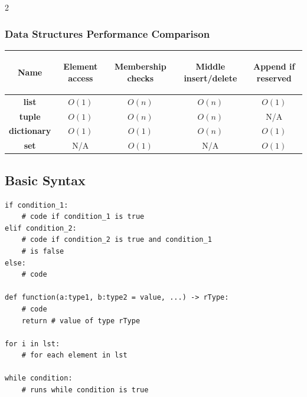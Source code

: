 \documentclass[5pt]{article}
\begin{document}
\begin{multicols}{2}
\subsubsection{Data Structures Performance Comparison}
\begin{tabular}{|>{\small\bfseries}c|>{\small}c|>{\small}c|>{\small}c|>{\small}c|}
    \hline
    Name   & \begin{sideways}Element access\end{sideways} & \begin{sideways}Membership checks\end{sideways} & \begin{sideways}Middle insert/delete\end{sideways} & \begin{sideways}Append if reserved\end{sideways} \\
    \hline
    list        & $O(1)$ & $O(n) $ & $O(n)$ & $O(1)$ \\
    tuple       & $O(1)$ & $O(n) $ & $O(n)$ & N/A    \\
    dictionary  & $O(1)$ & $O(1) $ & $O(n)$ & $O(1)$ \\
    set         & N/A    & $O(1) $ & N/A    & $O(1)$ \\
    \hline
\end{tabular}

\subsection{Basic Syntax}
\begin{verbatim}
if condition_1:
    # code if condition_1 is true
elif condition_2:
    # code if condition_2 is true and condition_1
    # is false
else:
    # code

def function(a:type1, b:type2 = value, ...) -> rType:
    # code
    return # value of type rType

for i in lst:
    # for each element in lst

while condition:
    # runs while condition is true
\end{verbatim}



\end{multicols}
\end{document}
